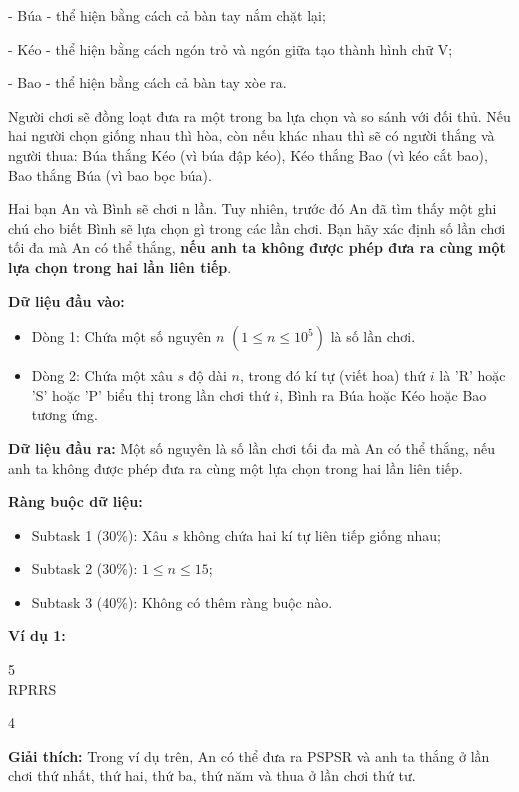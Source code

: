 \documentclass[12pt]{scrartcl}  %
\begin{document}
- Búa - thể hiện bằng cách cả bàn tay nắm chặt lại;

- Kéo - thể hiện bằng cách ngón trỏ và ngón giữa tạo thành hình chữ V;

- Bao - thể hiện bằng cách cả bàn tay xòe ra.

Người chơi sẽ đồng loạt đưa ra một trong ba lựa chọn và so sánh với đối thủ. Nếu hai người chọn giống nhau thì hòa, còn nếu khác nhau thì sẽ có người thắng và người thua: Búa thắng Kéo (vì búa đập kéo), Kéo thắng Bao (vì kéo cắt bao), Bao thắng Búa (vì bao bọc búa).

Hai bạn An và Bình sẽ chơi n lần. Tuy nhiên, trước đó An đã tìm thấy một ghi chú cho biết Bình sẽ lựa chọn gì trong các lần chơi. Bạn hãy xác định số lần chơi tối đa mà An có thể thắng, \textbf{nếu anh ta không được phép đưa ra cùng một lựa chọn trong hai lần liên tiếp}.

\textbf{Dữ liệu đầu vào:}
\begin{itemize}
    \item Dòng 1: Chứa một số nguyên $n$ $(1 \leq n \leq 10^5)$ là số lần chơi.
    \item Dòng 2: Chứa một xâu $s$ độ dài $n$, trong đó kí tự (viết hoa) thứ $i$ là 'R' hoặc 'S' hoặc 'P' biểu thị trong lần chơi
thứ $i$, Bình ra Búa hoặc Kéo hoặc Bao tương ứng.
\end{itemize}

\textbf{Dữ liệu đầu ra:}
Một số nguyên là số lần chơi tối đa mà An có thể thắng, nếu anh ta không được phép đưa ra cùng một lựa chọn trong hai lần liên tiếp.

\textbf{Ràng buộc dữ liệu:}
\begin{itemize}
    \item Subtask 1 (30\%): Xâu $s$ không chứa hai kí tự liên tiếp giống nhau;
    \item Subtask 2 (30\%): $1 \leq n \leq 15$;
    \item Subtask 3 (40\%): Không có thêm ràng buộc nào.
\end{itemize}

\textbf{Ví dụ 1:}
\begin{tcolorbox}[colback=gray!5!white, colframe=blue!50!black, title=Input]
5\\
RPRRS
\end{tcolorbox}
\begin{tcolorbox}[colback=gray!5!white, colframe=green!50!black, title=Output]
4
\end{tcolorbox}

\textbf{Giải thích:}
Trong ví dụ trên, An có thể đưa ra PSPSR và anh ta thắng ở lần chơi thứ nhất, thứ hai, thứ ba, thứ năm và thua ở lần chơi thứ tư.
\end{document}
